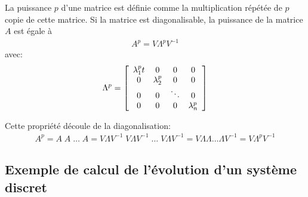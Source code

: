 La puissance $p$ d'une matrice est définie comme la multiplication répétée de $p$ copie de cette matrice. Si la matrice est diagonalisable, la puissance de la matrice $A$ est égale à
\begin{align}
	A^p = V \Lambda^p V^{-1}
	\label{eq:matrixpower}
\end{align}
avec:
\begin{align}
	\Lambda^p =
	\left[ \begin{array}{c c c c}
			   \lambda_1^p t &  0          & 0 & 0 \\
			   0         &  \lambda_2^p  & 0      & 0 \\
			   0         &  0          &\ddots  & 0 \\
			   0         &  0          & 0  & \lambda_n^p
	\end{array} \right]
\end{align}

Cette propriété découle de la diagonalisation:
\begin{align}
	A^p = A \; A \; \hdots \; A = V \Lambda V^{-1} \; V \Lambda V^{-1} \;  \hdots \; V \Lambda V^{-1} = V \Lambda \Lambda   \hdots \Lambda V^{-1} = V \Lambda^p V^{-1}
\end{align}

\subsection{Exemple de calcul de l'évolution d'un système discret}

